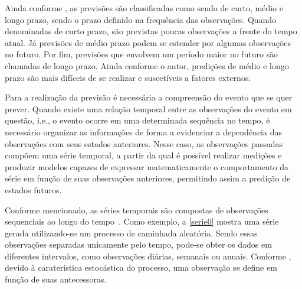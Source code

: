\documentclass[
    12pt,
    oneside,
    a4paper,
    english,
    brazil
]{abntex2}
\begin{document}
Ainda conforme  , as  previsões são classificadas  como sendo
de  curto,  médio  e  longo  prazo,   sendo  o  prazo  definido  na  frequência
das  observações.  Quando denominadas  de  curto  prazo, são  previstas  poucas
observações  a frente  do tempo  atual. Já  previsões de  médio prazo  podem se
estender por algumas observações no futuro.  Por fim, previsões que envolvem um
período maior  no futuro são chamadas  de longo prazo. Ainda  conforme o autor,
predições de médio e longo prazo são mais difíceis de se realizar e suscetíveis
a fatores externos.


Para a realização da previsão é necessária  a compreensão do evento que se quer
prever. Quando  existe uma relação temporal  entre as observações do  evento em
questão,  i.e., o  evento  ocorre  em uma  determinada  sequência  no tempo,  é
necessário organizar  as informações  de forma a  evidenciar a  dependência das
observações com  seus estados anteriores.  Nesse caso, as  observações passadas
compõem uma  série temporal, a  partir da qual  é possível realizar  medições e
produzir modelos capazes de expressar  matematicamente o comportamento da série
em  função de  suas  observações  anteriores, permitindo  assim  a predição  de
estados futuros.

Conforme  mencionado,   as  séries  temporais  são   compostas  de  observações
sequenciais ao  longo do  tempo~\cite{wiley}. Como exemplo,  a \autoref{serie0}
mostra uma série gerada utilizando-se um processo de caminhada aleatória. Sendo
essas observações  separadas unicamente pelo  tempo, pode-se obter os  dados em
diferentes intervalos,  como observações diárias, semanais  ou anuais. Conforme
,  devido  à  caraterística  estocástica  do  processo,  uma
observação se define em função de suas antecessoras.
\end{document}
